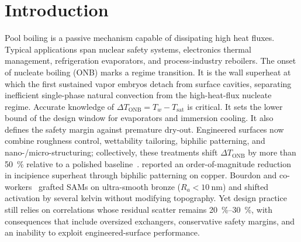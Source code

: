 
\section{Introduction}\label{sec:introduction}

Pool boiling is a passive mechanism capable of dissipating high heat
fluxes. Typical applications span nuclear safety systems, electronics
thermal management, refrigeration evaporators, and process-industry
reboilers.
The onset of nucleate boiling (ONB) marks a regime transition. It is
the wall superheat at which the first sustained vapor embryos detach
from surface cavities, separating inefficient single-phase natural
convection from the high-heat-flux nucleate regime. Accurate knowledge
of $\Delta T_{\mathrm{ONB}} = T_w - T_{\mathrm{sat}}$ is critical. It
sets the lower bound of the design window for evaporators and immersion
cooling. It also defines the safety margin against premature dry-out.
Engineered surfaces now combine roughness control, wettability
tailoring, biphilic patterning, and nano-/micro-structuring;
collectively, these treatments shift $\Delta T_{\mathrm{ONB}}$ by more
than \SI{50}{\percent} relative to a polished
baseline~\citep{betz2013,phan2009,jo2011,bourdon2012,bourdon2015}.
\citet{betz2013} reported an order-of-magnitude reduction in incipience
superheat through biphilic patterning on copper. Bourdon and
co-workers~\citep{bourdon2012,bourdon2015} grafted SAMs on ultra-smooth
bronze ($R_a<\SI{10}{\nano\meter}$) and shifted activation by several
kelvin without modifying topography. Yet design practice still relies
on correlations whose residual scatter remains
\SIrange{20}{30}{\percent}, with consequences that include oversized
exchangers, conservative safety margins, and an inability to exploit
engineered-surface performance.

